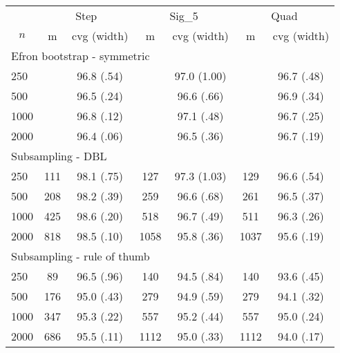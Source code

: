 \begin{tabular}{lcccccc}
   \toprule
 
           & \multicolumn{2}{c}{Step}& \multicolumn{2}{c}{Sig\_5}& \multicolumn{2}{c}{Quad} \\ 
             \cmidrule(l{2pt}r{2pt}){2-3} \cmidrule(l{2pt}r{2pt}){4-5} \cmidrule(l{2pt}r{2pt}){6-7} 
             \multicolumn{1}{c}{$n$} & \multicolumn{1}{c}{m}& \multicolumn{1}{c}{cvg (width)}& \multicolumn{1}{c}{m}& \multicolumn{1}{c}{cvg (width)}& \multicolumn{1}{c}{m}& \multicolumn{1}{c}{cvg (width)} \\  
             \hline   
 \multicolumn{7}{l}{Efron bootstrap - symmetric} \\ 
250 &  & 96.8 (.54) &  & 97.0 (1.00) &  & 96.7 (.48) \\ 
  500 &  & 96.5 (.24) &  & 96.6 (.66) &  & 96.9 (.34) \\ 
  1000 &  & 96.8 (.12) &  & 97.1 (.48) &  & 96.7 (.25) \\ 
  2000 &  & 96.4 (.06) &  & 96.5 (.36) &  & 96.7 (.19) \\ 
       \hline   
 \multicolumn{7}{l}{Subsampling - DBL} \\ 
250 & 111 & 98.1 (.75) & 127 & 97.3 (1.03) & 129 & 96.6 (.54) \\ 
  500 & 208 & 98.2 (.39) & 259 & 96.6 (.68) & 261 & 96.5 (.37) \\ 
  1000 & 425 & 98.6 (.20) & 518 & 96.7 (.49) & 511 & 96.3 (.26) \\ 
  2000 & 818 & 98.5 (.10) & 1058 & 95.8 (.36) & 1037 & 95.6 (.19) \\ 
       \hline   
 \multicolumn{7}{l}{Subsampling - rule of thumb} \\ 
250 & 89 & 96.5 (.96) & 140 & 94.5 (.84) & 140 & 93.6 (.45) \\ 
  500 & 176 & 95.0 (.43) & 279 & 94.9 (.59) & 279 & 94.1 (.32) \\ 
  1000 & 347 & 95.3 (.22) & 557 & 95.2 (.44) & 557 & 95.0 (.24) \\ 
  2000 & 686 & 95.5 (.11) & 1112 & 95.0 (.33) & 1112 & 94.0 (.17) \\ 
   \hline
\end{tabular}
